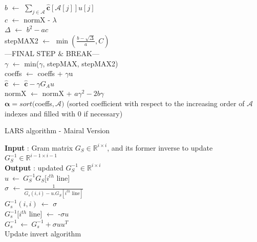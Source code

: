 \documentclass{ipol}
\newcommand{\code}{\bm{\alpha}}
\newcommand{\clars}{\hat{\textbf{c}}}
\newcommand{\A}{\mathcal{A}}
\begin{document}
\begin{algorithm}[H]
{	$b$ $\leftarrow$ $\sum_{j \in \A} \clars[\A[j]] u[j]$\\
	$c$ $\leftarrow$ normX - $\lambda$\\
	$\Delta$ $\leftarrow$ $b^2 - ac$ \\
	stepMAX2 $\leftarrow$ $\min(\frac{b - \sqrt{\Delta}}{a}, C)$ \\
	---FINAL STEP $\&$ BREAK---\\
	$\gamma$ $\leftarrow$ min($\gamma$, stepMAX, stepMAX2)\\
	coeffs $\leftarrow$ coeffs + $\gamma$u \\
	$\clars$ $\leftarrow$ $\clars - \gamma G_Au$ \\
	normX $\leftarrow$ normX + $a\gamma^2 - 2b\gamma$ \\
}
\Return $\code = sort($coeffs$, \A)$ (sorted coefficient with respect to the increasing order of $\A$ indexes and filled with 0 if necessary)
	
\caption{LARS algorithm - Mairal Version}

\end{algorithm}

\newpage

\begin{algorithm}[H]

\SetLine
\textbf{Input} : Gram matrix $G_S \in \mathbb{R}^{i \times i}$, and its former inverse to update $G_S^{-1}\in \mathbb{R}^{i-1 \times i-1}$\\
\textbf{Output} : updated  $G_S^{-1}\in \mathbb{R}^{i \times i}$\\
$u \ \leftarrow \ G_S^{-1} G_S[i^{th}$ line]\\
$\sigma$ $\leftarrow \ \frac{1}{G_s(i,i) - u.G_S[i^{th} \text{ line}]}$\\
$G_s^{-1}(i,i)\ \leftarrow$ $\sigma$\\
$G_s^{-1}[i^{th}$ line] $\leftarrow$ -$\sigma u$\\
\Return $G_s^{-1} \ \leftarrow \ G_s^{-1}+\sigma u u^T$\\
\caption{Update invert algorithm}

\end{algorithm}
\end{document}
